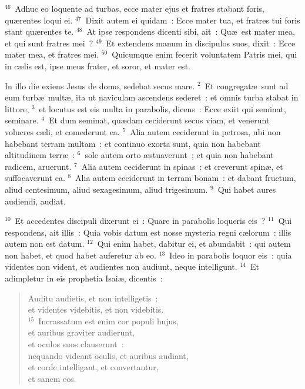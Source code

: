 ${}^{46}$~Adhuc eo loquente ad turbas, ecce mater ejus et fratres stabant foris, qu\ae rentes loqui ei.
${}^{47}$~Dixit autem ei quidam~: Ecce mater tua, et fratres tui foris stant qu\ae rentes te.
${}^{48}$~At ipse respondens dicenti sibi, ait~: Qu\ae\ est mater mea, et qui sunt fratres mei~?
${}^{49}$~Et extendens manum in discipulos suos, dixit~: Ecce mater mea, et fratres mei.
${}^{50}$~Quicumque enim fecerit voluntatem Patris mei, qui in c\ae lis est, ipse meus frater, et soror, et mater est.

\lettrine[lines=10,image=true,loversize=0.05,lraise=-0.03]{I}{}n illo die exiens Jesus de domo, sedebat secus mare.
${}^{2}$~Et congregat\ae\ sunt ad eum turb\ae\ mult\ae , ita ut naviculam ascendens sederet~: et omnis turba stabat in littore,
${}^{3}$~et locutus est eis multa in parabolis, dicens~: Ecce exiit qui seminat, seminare.
${}^{4}$~Et dum seminat, qu\ae dam ceciderunt secus viam, et venerunt volucres c\ae li, et comederunt ea.
${}^{5}$~Alia autem ceciderunt in petrosa, ubi non habebant terram multam~: et continuo exorta sunt, quia non habebant altitudinem terr\ae~:
${}^{6}$~sole autem orto \ae stuaverunt~; et quia non habebant radicem, aruerunt.
${}^{7}$~Alia autem ceciderunt in spinas~: et creverunt spin\ae , et suffocaverunt ea.
${}^{8}$~Alia autem ceciderunt in terram bonam~: et dabant fructum, aliud centesimum, aliud sexagesimum, aliud trigesimum.
${}^{9}$~Qui habet aures audiendi, audiat.


${}^{10}$~Et accedentes discipuli dixerunt ei~: Quare in parabolis loqueris eis~?
${}^{11}$~Qui respondens, ait illis~: Quia vobis datum est nosse mysteria regni c\ae lorum~: illis autem non est datum.
${}^{12}$~Qui enim habet, dabitur ei, et abundabit~: qui autem non habet, et quod habet auferetur ab eo.
${}^{13}$~Ideo in parabolis loquor eis~: quia videntes non vident, et audientes non audiunt, neque intelligunt.
${}^{14}$~Et adimpletur in eis prophetia Isai\ae , dicentis~: \begin{flushleft}\begin{verse}Auditu audietis, et non intelligetis~:\\ et videntes videbitis, et non videbitis.\\
${}^{15}$~Incrassatum est enim cor populi hujus,\\ et auribus graviter audierunt,\\ et oculos suos clauserunt~:\\ nequando videant oculis, et auribus audiant,\\ et corde intelligant, et convertantur,\\ et sanem eos.\end{verse}\end{flushleft}


